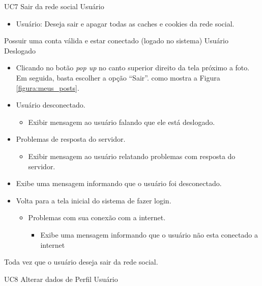 \casoDeUso
{UC7}
{Sair da rede social}
{Usuário}
{
\begin{itemize}
	\item Usuário: Deseja sair e apagar todas as caches e cookies da rede social.
\end{itemize}
}
{Possuir uma conta válida e estar conectado (logado no sistema)}
{Usuário Deslogado}
{
\begin{itemize}
	\item Clicando no botão  \textit{pop up} no canto superior direito da tela próximo a foto. Em seguida, basta escolher a opção “Sair”.  como mostra a Figura  \ref{figura:meus_posts}.
\end{itemize}
}
{
\begin{itemize}
	\item Usuário desconectado.
		\begin{itemize}
		\item Exibir mensagem  ao usuário falando que ele está deslogado.
	\end{itemize}
	\item Problemas de resposta do servidor.
		\begin{itemize}
		\item Exibir mensagem  ao usuário relatando problemas com resposta do servidor.
	\end{itemize}
	\item Exibe uma mensagem informando que o usuário foi desconectado.
	\item Volta para a tela inicial do sistema de fazer login.
		\begin{itemize}
	\item Problemas com sua conexão com a internet.
		\begin{itemize}
		\item Exibe uma mensagem informando que o usuário não esta conectado a internet
	\end{itemize}
\end{itemize}
	
\end{itemize}
}
{Toda vez que o usuário deseja sair da rede social.}
{

}
\casoDeUso
{UC8}
{Alterar dados de Perfil}
{Usuário}

